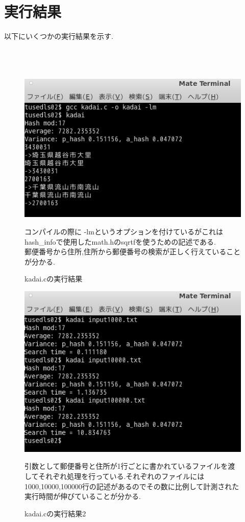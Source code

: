 \documentclass{jsarticle}
\begin{document}
\section{実行結果}
以下にいくつかの実行結果を示す.\\\\\\\\
\begin{figure}[!htbp]
\begin{center}
\includegraphics[width=150mm]{1.png}
\caption{kadai.cの実行結果}
\end{center}
コンパイルの際に -lmというオプションを付けているがこれはhash\_infoで使用したmath.hのsqrtfを使うための記述である.\\
郵便番号から住所,住所から郵便番号の検索が正しく行えていることが分かる.
\end{figure}
\newpage

\begin{figure}[!htbp]
\begin{center}
\includegraphics[width=150mm]{2.png}
\caption{kadai.cの実行結果2}
\end{center}
引数として郵便番号と住所が1行ごとに書かれているファイルを渡してそれぞれ処理を行っている.それぞれのファイルには1000,10000,100000行の記述があるのでその数に比例して計測された実行時間が伸びていることが分かる.
\end{figure}
\newpage
\end{document}
